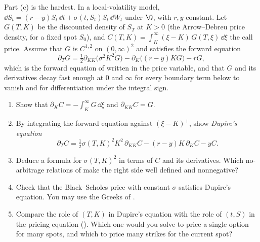 \begin{exercise}\label{ex:sr-dupire}
\medium Part (c) is the hardest. In a local-volatility model, $\dd S_t=(r-y)S_t\,\dd t+\sigma(t,S_t)S_t\,\dd W_t$ under $\Q$, with $r,y$ constant.
Let $G(T,K)$ be the discounted density of $S_T$ at $K>0$ (the Arrow--Debreu price density, for a fixed spot
$S_0$), and $C(T,K)=\int_K^\infty(\xi-K)\,G(T,\xi)\,\dd\xi$ the call price. Assume that $G$ is $C^{1,2}$ on
$(0,\infty)^2$ and satisfies the forward equation
\[
  \partial_TG=\tfrac12\partial_{KK}\big(\sigma^2K^2G\big)-\partial_K\big((r-y)KG\big)-rG,
\]
which is the forward equation of  written in the price variable, and that $G$ and its derivatives decay fast enough
at $0$ and $\infty$ for every boundary term below to vanish and for differentiation under the integral sign.
\begin{enumerate}[label=(\alph*)]
  \item Show that $\partial_KC=-\int_K^\infty G\,\dd\xi$ and $\partial_{KK}C=G$.
  \item By integrating the forward equation against $(\xi-K)^+$, show \emph{Dupire's equation}
    \[
      \partial_TC=\tfrac12\sigma(T,K)^2K^2\,\partial_{KK}C-(r-y)K\,\partial_KC-yC .
    \]
  \item Deduce a formula for $\sigma(T,K)^2$ in terms of $C$ and its derivatives. Which no-arbitrage relations
    of  make the right side well defined and nonnegative?
  \item Check that the Black--Scholes price with constant $\sigma$ satisfies Dupire's equation. You may use the
    Greeks of .
  \item Compare the role of $(T,K)$ in Dupire's equation with the role of $(t,S)$ in the pricing equation
    (). Which one would you solve to price a single option for many spots, and which to price
    many strikes for the current spot?
\end{enumerate}
\end{exercise}

